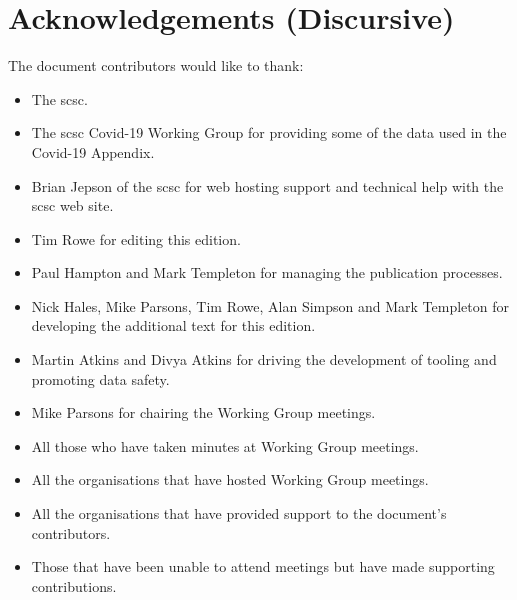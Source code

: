 %
%
\section{Acknowledgements (Discursive)} \label{bkm:acknowledgements}


The document contributors would like to thank:
\begin{itemize}
  \item The \gls{scsc}.
  \item The \gls{scsc} Covid-19 Working Group for providing some of the data used in the Covid-19 Appendix.
  \item Brian Jepson of the \gls{scsc} for web hosting support and technical help with the \gls{scsc} web site.
  \item
    Tim Rowe for editing this edition.
  \item Paul Hampton
    and
    Mark Templeton for managing the publication processes.
  \item
    Nick Hales, Mike Parsons, Tim Rowe, Alan Simpson and Mark Templeton
    for developing the additional text for this edition.
  \item
    Martin Atkins and Divya Atkins for driving the development of tooling and promoting data safety.
  \item Mike Parsons for chairing the Working Group meetings.
  \item All those who have taken minutes at Working Group meetings.
  \item
    All the organisations that have hosted Working Group meetings.
  \item All the organisations that have provided support to the document's contributors.
  \item Those that have been unable to attend meetings but have made supporting contributions.
\end{itemize}
